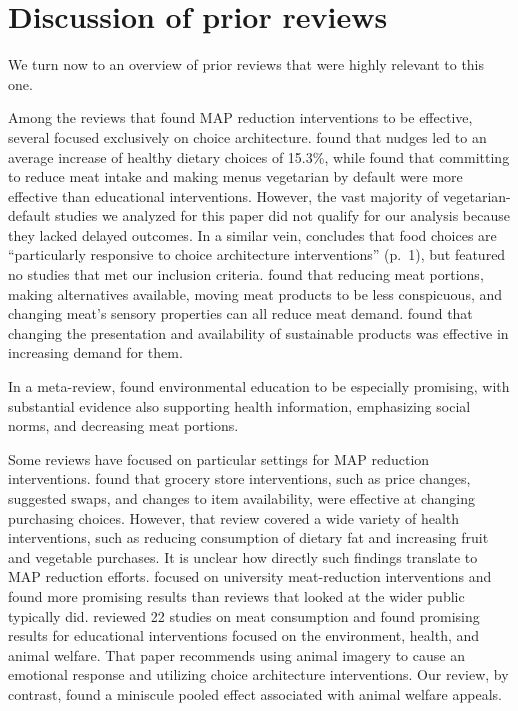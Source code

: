 \documentclass[sn-nature,referee,lineno,pdflatex]{sn-jnl}
\begin{document}
\section{Discussion of prior reviews}\label{discussion-of-prior-reviews}

We turn now to an overview of prior reviews that were highly relevant to
this one.

Among the reviews that found MAP reduction interventions to be
effective, several focused exclusively on choice architecture.
\citep{arno2016} found that nudges led to an average increase of healthy
dietary choices of 15.3\%, while \citep{byerly2018} found that
committing to reduce meat intake and making menus vegetarian by default
were more effective than educational interventions. However, the vast
majority of vegetarian-default studies we analyzed for this paper did
not qualify for our analysis because they lacked delayed outcomes. In a
similar vein, \citep{mertens2022} concludes that food choices are
``particularly responsive to choice architecture interventions'' (p.~1),
but featured no studies that met our inclusion criteria.
\citep{bianchi2018restructuring} found that reducing meat portions,
making alternatives available, moving meat products to be less
conspicuous, and changing meat's sensory properties can all reduce meat
demand. \citep{pandey2023} found that changing the presentation and
availability of sustainable products was effective in increasing demand
for them.

In a meta-review, \citep{grundy2022} found environmental education to be
especially promising, with substantial evidence also supporting health
information, emphasizing social norms, and decreasing meat portions.

Some reviews have focused on particular settings for MAP reduction
interventions. \citep{hartmannboyce2018} found that grocery store
interventions, such as price changes, suggested swaps, and changes to
item availability, were effective at changing purchasing choices.
However, that review covered a wide variety of health interventions,
such as reducing consumption of dietary fat and increasing fruit and
vegetable purchases. It is unclear how directly such findings translate
to MAP reduction efforts. \citep{chang2023} focused on university
meat-reduction interventions and found more promising results than
reviews that looked at the wider public typically did.
\citep{harguess2020} reviewed 22 studies on meat consumption and found
promising results for educational interventions focused on the
environment, health, and animal welfare. That paper recommends using
animal imagery to cause an emotional response and utilizing choice
architecture interventions. Our review, by contrast, found a miniscule
pooled effect associated with animal welfare appeals.
\end{document}
